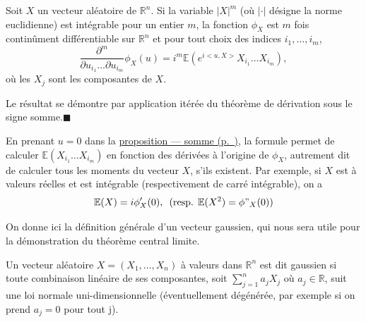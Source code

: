 \begin{proposition}\label{IV-fct_carac_deriv}

Soit \(X\) un vecteur aléatoire de \(\mathbb{R}^n\). Si la variable
\(|X|^m\) (où \(|\cdot|\) désigne la norme euclidienne) est intégrable
pour un entier \(m\), la fonction \(\phi_X\) est \(m\) fois continûment
différentiable sur \(\mathbb{R}^n\) et pour tout choix des indices
\(i_1,\ldots, i_m\),
\[ \frac{\partial^m}{\partial u_{i_1}\ldots \partial u_{i_m}} \phi_X(u) = i^m \mathbb{E}(e^{i < u,X >}X_{i_1}\ldots X_{i_m}),\]
où les \(X_j\) sont les composantes de \(X\).
\end{proposition}

\begin{preuve}
Le résultat se démontre par application itérée du théorème de dérivation
sous le signe somme.\hfill$\blacksquare$
\end{preuve}

\begin{remarque}\label{IV-remarque}
En prenant \(u=0\) dans la
\protect\hyperref[IV-fct_carac_sum]{proposition ---
somme (p.~\pageref*{IV-fct_carac_sum})}, la formule permet de calculer
\(\mathbb{E}(X_{i_1}\ldots X_{i_m})\) en fonction des dérivées à
l'origine de \(\phi_X\), autrement dit de calculer tous les moments du
vecteur \(X\), s'ils existent. Par exemple, si \(X\) est à valeurs
réelles et est intégrable (respectivement de carré intégrable), on a
\[\mathbb{E}(X) = i \phi'_X(0), \,\,\,(\text{resp. } \mathbb{E}(X^2) = \phi"_X(0))\]

On donne ici la définition générale d'un vecteur gaussien, qui nous sera
utile pour la démonstration du théorème central limite.
\end{remarque}

\begin{definition}\label{IV-gauss_vec}

Un vecteur aléatoire \(X=(X_1,\ldots,X_n)\) à valeurs dans
\(\mathbb{R}^n\) est dit gaussien si toute combinaison linéaire de ses
composantes, soit \(\sum_{j=1}^n a_j X_j\) où \(a_j \in \mathbb{R}\),
suit une loi normale uni-dimensionnelle (éventuellement dégénérée, par
exemple si on prend \(a_j = 0\) pour tout j).
\end{definition}

